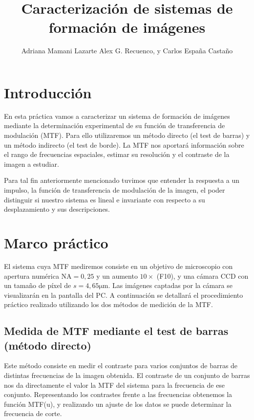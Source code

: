 \documentclass{./packages/optica-article}
\begin{document}
\title{Caracterización de sistemas de formación de imágenes}

\author{Adriana Mamani Lazarte Alex G. Recuenco, y Carlos España Castaño}

\address{Universidad Complutense de Madrid, Madrid, CP 28040, España}

\tableofcontents
\newpage

\section{Introducción}
En esta práctica vamos a caracterizar un sistema de formación de imágenes mediante la determinación experimental de su función de transferencia de modulación (MTF). Para ello utilizaremos un método directo (el test de barras) y un método indirecto (el test de borde). La MTF nos aportará información sobre el rango de frecuencias espaciales, estimar su resolución y el contraste de la imagen a estudiar.

Para tal fin anteriormente mencionado tuvimos que entender la respuesta a un impulso, la función de transferencia de modulación de la imagen, el poder distinguir si nuestro sistema es lineal e invariante con respecto a su desplazamiento y sus descripciones.




\section{Marco práctico}
El sistema cuya MTF mediremos consiste en un objetivo de microscopio con apertura numérica $\textrm{NA} = 0,25$ y un aumento $10\times$ (F10),
y una cámara CCD con un tamaño de píxel de $s=4,65 \unit{\micro\meter}$.
Las imágenes captadas por la cámara se visualizarán en la pantalla del PC.
A continuación se detallará el procedimiento práctico realizado utilizando los dos métodos de medición de la MTF.


\subsection{Medida de MTF mediante el test de barras (método directo)}\label{sec:metodo-directo}

Este método consiste en medir el contraste para varios conjuntos de barras de distintas frecuencias de la imagen obtenida. El contraste de un conjunto de barras nos da directamente el valor la MTF del sistema para la frecuencia de ese conjunto. Representando los contrastes frente a las frecuencias obtenemos la función MTF(u), y realizando un ajuste de los datos se puede determinar la frecuencia de corte.
\end{document}

